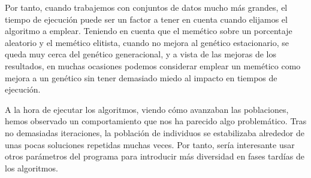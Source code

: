 \documentclass[11pt]{article}
\begin{document}
Por tanto, cuando trabajemos con conjuntos de datos mucho más grandes, el tiempo de ejecución puede ser un factor a tener en cuenta cuando elijamos el algoritmo a emplear. Teniendo en cuenta que el memético sobre un porcentaje aleatorio y el memético elitista, cuando no mejora al genético estacionario, se queda muy cerca del genético generacional, y a vista de las mejoras de los resultados, en muchas ocasiones podemos considerar emplear un memético como mejora a un genético sin tener demasiado miedo al impacto en tiempos de ejecución.

A la hora de ejecutar los algoritmos, viendo cómo avanzaban las poblaciones, hemos observado un comportamiento que nos ha parecido algo problemático. Tras no demasiadas iteraciones, la población de individuos se estabilizaba alrededor de unas pocas soluciones repetidas muchas veces. Por tanto, sería interesante usar otros parámetros del programa para introducir más diversidad en fases tardías de los algoritmos.

\pagebreak



\end{document}
